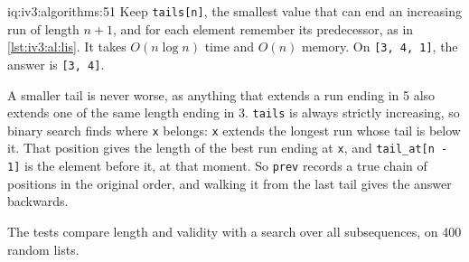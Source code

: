 \begin{solution}{iq:iv3:algorithms:51}
Keep \texttt{tails[n]}, the smallest value that can end an increasing run of length $n + 1$, and for each element remember its predecessor, as in \cref{lst:iv3:al:lis}. It takes $O(n \log n)$ time and $O(n)$ memory. On \texttt{[3, 4, 1]}, the answer is \texttt{[3, 4]}.
\label{lst:iv3:al:lis}

A smaller tail is never worse, as anything that extends a run ending in 5 also extends one of the same length ending in 3. \texttt{tails} is always strictly increasing, so binary search finds where \texttt{x} belongs: \texttt{x} extends the longest run whose tail is below it. That position gives the length of the best run ending at \texttt{x}, and \texttt{tail\_at[n - 1]} is the element before it, at that moment. So \texttt{prev} records a true chain of positions in the original order, and walking it from the last tail gives the answer backwards.

The tests compare length and validity with a search over all subsequences, on 400 random lists.

\end{solution}

